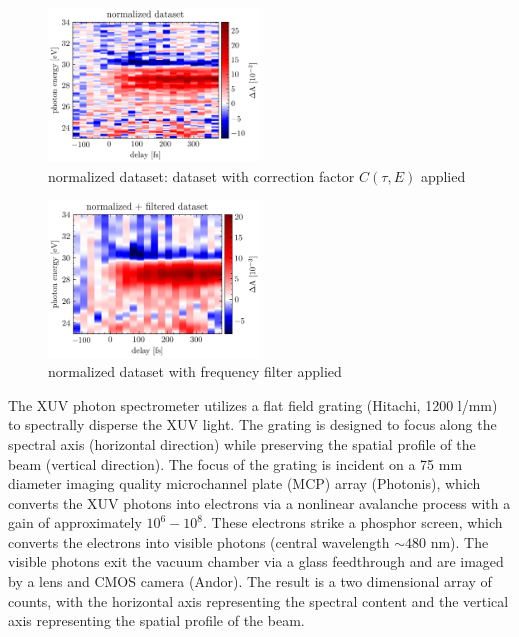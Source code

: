 \begin{figure}
	\centering
	\includegraphics[width=0.5\textwidth]{figures/chap3/Ge_corrected_raw_spectrogram.png}
	\caption{normalized dataset: dataset with correction factor $C(\tau,E)$ applied }
	\label{fig:Ge_corrected_raw_spectrogram}
\end{figure}

\begin{figure}
	\centering
	\includegraphics[width=0.5\textwidth]{figures/chap3/Ge_corrected_filtered_spectrogram.png}
	\caption{normalized dataset with frequency filter applied }
	\label{fig:Ge_corrected_filtered_spectrogram}
\end{figure}


The XUV photon spectrometer utilizes a flat field grating (Hitachi, 1200 l/mm) to spectrally disperse the XUV light. The grating is designed to focus along the spectral axis (horizontal direction) while preserving the spatial profile of the beam (vertical direction). The focus of the grating is incident on a 75 mm diameter imaging quality microchannel plate (MCP) array (Photonis), which converts the XUV photons into electrons via a nonlinear avalanche process with a gain of approximately $10^6 - 10^8$. These electrons strike a phosphor screen, which converts the electrons into visible photons (central wavelength $\sim480$ nm). The visible photons exit the vacuum chamber via a glass feedthrough and are imaged by a lens and CMOS camera (Andor). The result is a two dimensional array of counts, with the horizontal axis representing the spectral content and the vertical axis representing the spatial profile of the beam.

